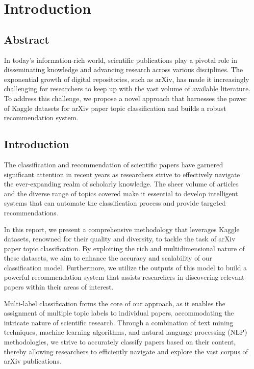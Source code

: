 \chapter{Introduction}

\section{Abstract}
In today's information-rich world, scientific publications play a pivotal role in disseminating knowledge and advancing research across various disciplines. The exponential growth of digital repositories, such as arXiv, has made it increasingly challenging for researchers to keep up with the vast volume of available literature. To address this challenge, we propose a novel approach that harnesses the power of Kaggle datasets for arXiv paper topic classification and builds a robust recommendation system.

\section{Introduction}
The classification and recommendation of scientific papers have garnered significant attention in recent years as researchers strive to effectively navigate the ever-expanding realm of scholarly knowledge. The sheer volume of articles and the diverse range of topics covered make it essential to develop intelligent systems that can automate the classification process and provide targeted recommendations.

In this report, we present a comprehensive methodology that leverages Kaggle datasets, renowned for their quality and diversity, to tackle the task of arXiv paper topic classification. By exploiting the rich and multidimensional nature of these datasets, we aim to enhance the accuracy and scalability of our classification model. Furthermore, we utilize the outputs of this model to build a powerful recommendation system that assists researchers in discovering relevant papers within their areas of interest.

Multi-label classification forms the core of our approach, as it enables the assignment of multiple topic labels to individual papers, accommodating the intricate nature of scientific research. Through a combination of text mining techniques, machine learning algorithms, and natural language processing (NLP) methodologies, we strive to accurately classify papers based on their content, thereby allowing researchers to efficiently navigate and explore the vast corpus of arXiv publications.

